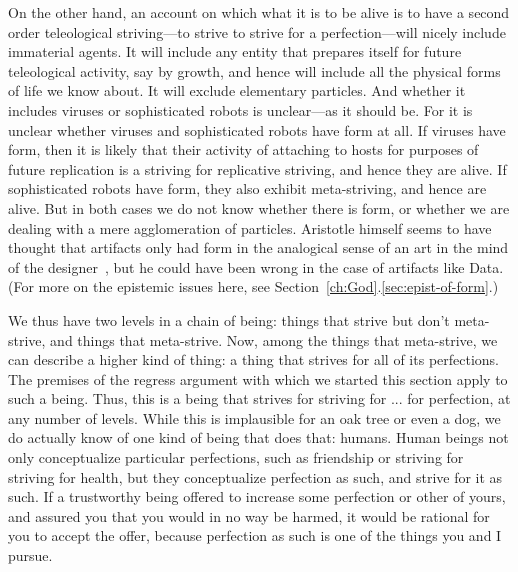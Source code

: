 On the other hand, an account on which what it is to be alive is to have a second order teleological striving---to strive to strive for a perfection---will nicely
include immaterial agents. It will include any entity that prepares itself for future teleological activity, say by growth,
and hence will include all the physical forms of life we know about. It will exclude elementary particles. And whether it includes viruses or sophisticated
robots is unclear---as it should be. For it is unclear whether viruses and sophisticated robots have form at all. If viruses have form, then it is likely
that their activity of attaching to hosts for purposes of future replication is a striving for replicative striving, and hence they are alive. If sophisticated robots have form, they also exhibit meta-striving, and hence are alive. But in both cases we do not
know whether there is form, or whether we are dealing with a mere agglomeration of particles.
Aristotle himself seems to have thought that
artifacts only had form in the analogical sense of an art in the mind of the designer~\parencite[\textit{Metaphysics} XII.4]{Aristotle}, but he could have been wrong in the case of artifacts like Data.
(For more on the epistemic issues here, see Section~\ref{ch:God}.\ref{sec:epist-of-form}.)

We thus have two levels in a chain of being: things that strive but don't meta-strive, and things that meta-strive. Now, among the things that meta-strive,
we can describe a higher kind of thing: a thing that strives for all of its perfections. The premises of the regress argument with which we started this
section apply to such a being. Thus, this is a being that strives for striving for ... for perfection, at any number of levels. While this is implausible
for an oak tree or even a dog, we do actually know of one kind of being that does that: humans. Human beings not only conceptualize particular perfections, such as friendship
or striving for striving for health, but they conceptualize perfection as such, and strive for it as such. If a trustworthy being offered to increase
some perfection or other of yours, and assured you that you would in no way be harmed, it would be rational for you to accept the offer, because perfection as
such is one of the things you and I pursue.

